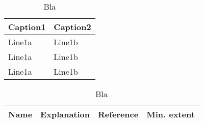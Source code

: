 \begin{table}[h]
	\centering
		\begin{tabular}{|p{170pt}|p{170pt}|}
			\hline
				\textbf{Caption1} & \textbf{Caption2} \\ \hline	
				Line1a & Line1b \\ \hline
				Line1a & Line1b \\ \hline
				Line1a & Line1b \\ \hline
		\end{tabular}
	\caption{Bla}
	\label{tab:name}
\end{table}


\begin{table}[h]
	\centering
		\begin{tabular}{|p{85pt}|p{85pt}|p{85pt}|p{85pt}|}
			\hline
				\textbf{Name} & \textbf{Explanation} & \textbf{Reference}& \textbf{Min. extent}\\ \hline	

		\end{tabular}
	\caption{Bla}
	\label{tab:name}
\end{table}